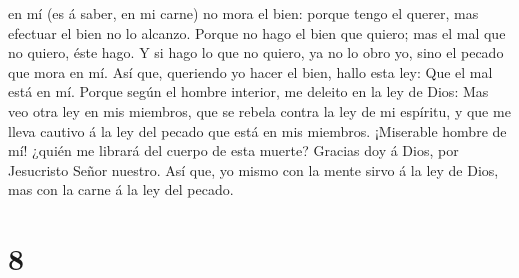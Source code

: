 en mí (es á saber, en mi carne) no mora el bien: porque tengo el querer,
mas efectuar el bien no lo alcanzo.  Porque no hago el
bien que quiero; mas el mal que no quiero, éste hago.  Y
si hago lo que no quiero, ya no lo obro yo, sino el pecado que mora en
mí.  Así que, queriendo yo hacer el bien, hallo esta ley:
Que el mal está en mí.  Porque según el hombre interior,
me deleito en la ley de Dios:  Mas veo otra ley en mis
miembros, que se rebela contra la ley de mi espíritu, y que me lleva
cautivo á la ley del pecado que está en mis miembros. 
¡Miserable hombre de mí! ¿quién me librará del cuerpo de esta muerte?
 Gracias doy á Dios, por Jesucristo Señor nuestro. Así
que, yo mismo con la mente sirvo á la ley de Dios, mas con la carne á la
ley del pecado.

\hypertarget{section-7}{%
\section{8}\label{section-7}}

